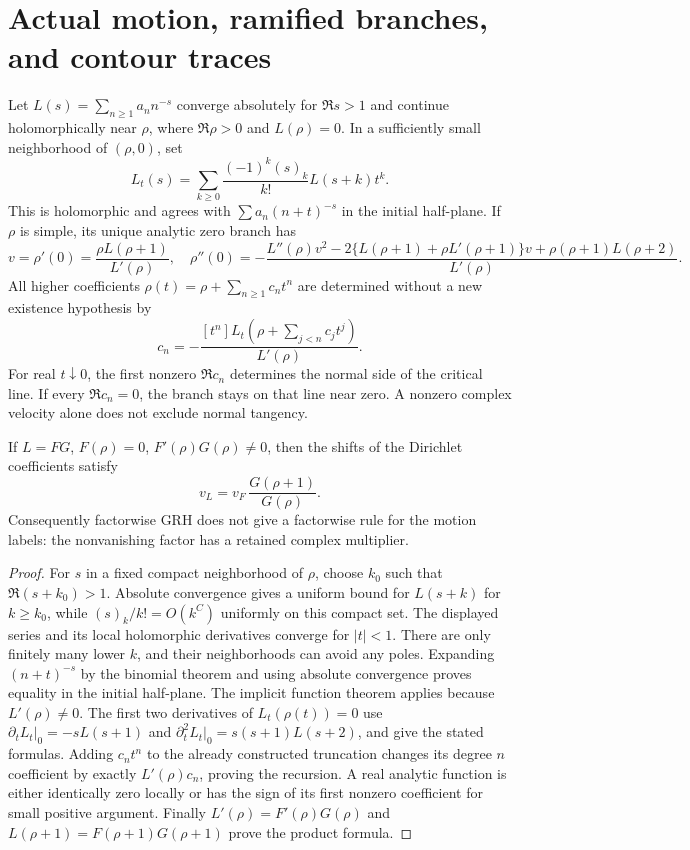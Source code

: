 \section{Actual motion, ramified branches, and contour traces}

\begin{theorem}
Let $L(s)=\sum_{n\ge1}a_n n^{-s}$ converge absolutely for $\Re s>1$
and continue holomorphically near $\rho$, where $\Re\rho>0$ and
$L(\rho)=0$. In a sufficiently small neighborhood of $(\rho,0)$, set
\[
 L_t(s)=\sum_{k\ge0}\frac{(-1)^k(s)_k}{k!}L(s+k)t^k.
\]
This is holomorphic and agrees with $\sum a_n(n+t)^{-s}$ in the initial
half-plane. If $\rho$ is simple, its unique analytic zero branch has
\[
 v=\rho'(0)=\frac{\rho L(\rho+1)}{L'(\rho)},
\quad
 \rho''(0)=-\frac{L''(\rho)v^2
 -2\{L(\rho+1)+\rho L'(\rho+1)\}v
 +\rho(\rho+1)L(\rho+2)}{L'(\rho)}.
\]
All higher coefficients $\rho(t)=\rho+\sum_{n\ge1}c_nt^n$ are determined
without a new existence hypothesis by
\[
 c_n=-\frac{[t^n]L_t(\rho+\sum_{j<n}c_jt^j)}{L'(\rho)}.
\]
For real $t\downarrow0$, the first nonzero $\Re c_n$ determines the
normal side of the critical line. If every $\Re c_n=0$, the branch stays
on that line near zero. A nonzero complex velocity alone does not exclude
normal tangency.

If $L=FG$, $F(\rho)=0$, $F'(\rho)G(\rho)\ne0$, then the shifts of the
Dirichlet coefficients satisfy
\[
 v_L=v_F\,\frac{G(\rho+1)}{G(\rho)}.
\]
Consequently factorwise GRH does not give a factorwise rule for the motion
labels: the nonvanishing factor has a retained complex multiplier.
\end{theorem}
\begin{proof}
For $s$ in a fixed compact neighborhood of $\rho$, choose $k_0$ such that
$\Re(s+k_0)>1$. Absolute convergence gives a uniform bound for $L(s+k)$
for $k\ge k_0$, while $(s)_k/k!=O(k^C)$ uniformly on this compact set.
The displayed series and its local holomorphic derivatives converge for
$|t|<1$. There are only finitely many lower $k$, and their neighborhoods
can avoid any poles. Expanding $(n+t)^{-s}$ by the binomial theorem and
using absolute convergence proves equality in the initial half-plane.
The implicit function theorem applies because $L'(\rho)\ne0$.
The first two derivatives of $L_t(\rho(t))=0$ use
$\partial_tL_t|_0=-sL(s+1)$ and
$\partial_t^2L_t|_0=s(s+1)L(s+2)$, and give the stated formulas.
Adding $c_nt^n$ to the already constructed truncation changes its degree
$n$ coefficient by exactly $L'(\rho)c_n$, proving the recursion. A
real analytic function is either identically zero locally or has the sign
of its first nonzero coefficient for small positive argument. Finally
$L'(\rho)=F'(\rho)G(\rho)$ and
$L(\rho+1)=F(\rho+1)G(\rho+1)$ prove the product formula.
\end{proof}

